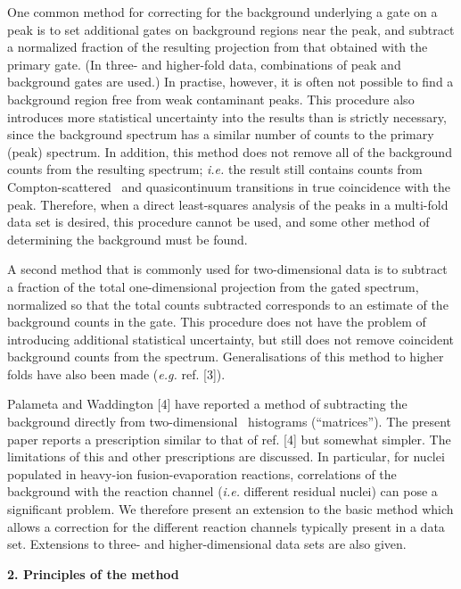 One common method for correcting for the background underlying a gate on a peak
is to set additional gates on background regions near the peak, and subtract a
normalized fraction of the resulting projection from that obtained with the
primary gate. (In three- and higher-fold data, combinations of peak and
background gates are used.) In practise, however, it is often not possible to
find a background region free from weak contaminant peaks. This procedure also
introduces more statistical uncertainty into the results than is strictly
necessary, since the background spectrum has a similar number of counts to the
primary (peak) spectrum. In addition, this method does not remove all of the
background counts from the resulting spectrum; {\em i.e.} the result still
contains counts from Compton-scattered \grays\ and quasicontinuum transitions
in true coincidence with the peak. Therefore, when a direct least-squares
analysis of the peaks in a multi-fold data set is desired, this procedure
cannot be used, and some other method of determining the background must be
found.

A second method that is commonly used for two-dimensional data is to subtract a
fraction of the total one-dimensional projection from the gated spectrum,
normalized so that the total counts subtracted corresponds to an estimate of
the background counts in the gate. This procedure does not have the problem of
introducing additional statistical uncertainty, but still does not remove
coincident background counts from the spectrum. Generalisations of this method
to higher folds have also been made ({\em e.g.} ref. [3]).

Palameta and Waddington [4] have reported a method of subtracting the
background directly from two-dimensional \ghg\ histograms (``matrices''). The
present paper reports a prescription similar to that of ref. [4] but somewhat
simpler. The limitations of this and other prescriptions are discussed. In
particular, for nuclei populated in heavy-ion fusion-evaporation reactions,
correlations of the background with the reaction channel ({\em i.e.} different
residual nuclei) can pose a significant problem. We therefore present an
extension to the basic method which allows a correction for the different
reaction channels typically present in a data set. Extensions to three- and
higher-dimensional data sets are also given.


\begin{center}
{\bf                      2. Principles of the method}
\end{center}

